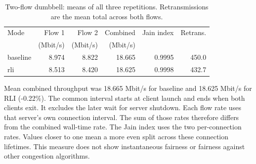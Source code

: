 \begin{table}[H]\centering\small
\begin{tabular}{lrrrrr}\toprule
Mode & Flow 1 & Flow 2 & Combined & Jain index & Retrans.\\
 & (Mbit/s) & (Mbit/s) & (Mbit/s) & & \\\midrule
baseline & 8.974 & 8.822 & 18.665 & 0.9995 & 450.0 \\
rli & 8.513 & 8.420 & 18.625 & 0.9998 & 432.7 \\
\bottomrule\end{tabular}
\caption{Two-flow dumbbell: means of all three repetitions. Retransmissions are the mean total across both flows.}\end{table}
Mean combined throughput was 18.665 Mbit/s for baseline and 18.625 Mbit/s for RLI (-0.22\%).
The common interval starts at client launch and ends when both clients exit.
It excludes the later wait for server shutdown.
Each flow rate uses that server's own connection interval.
The sum of those rates therefore differs from the combined wall-time rate.
The Jain index uses the two per-connection rates.
Values closer to one mean a more even split across these connection lifetimes.
This measure does not show instantaneous fairness or fairness against other congestion algorithms.
